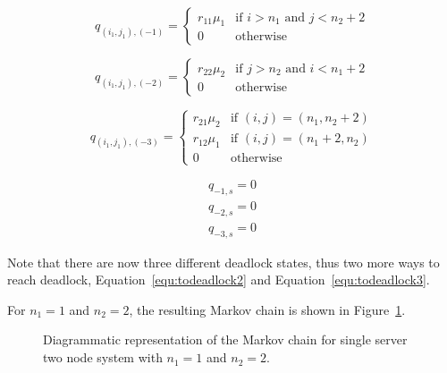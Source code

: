 \documentclass{article}
\numberwithin{equation}{section}
\begin{document}
\begin{equation}\label{equ:todeadlock2}
  q_{(i_1, j_1), (-1)} = \left\{
  \begin{array}{rr}
    r_{11}\mu_1 & \text{if } i > n_1 \text{ and } j < n_2 + 2 \\
    0 & \text{otherwise}
  \end{array}
  \right.
\end{equation}

\begin{equation}\label{equ:todeadlock3}
  q_{(i_1, j_1), (-2)} = \left\{
  \begin{array}{rr}
    r_{22}\mu_2 & \text{if } j > n_2 \text{ and } i < n_1 + 2 \\
    0 & \text{otherwise}
  \end{array}
  \right.
\end{equation}

\begin{equation}\label{eqn:2nssfB}
  q_{(i_1, j_1), (-3)} = \left\{
  \begin{array}{rr}
    r_{21}\mu_2 & \text{if } (i, j) = (n_1, n_2 + 2) \\
    r_{12}\mu_1 & \text{if } (i, j) = (n_1 + 2, n_2) \\
    0 & \text{otherwise}
  \end{array}
  \right.
\end{equation}

\begin{align}
  q_{-1, s} = 0 \\
  q_{-2, s} = 0 \\
  q_{-3, s} = 0
\end{align}

Note that there are now three different deadlock states, thus two more ways to
reach deadlock, Equation~\ref{equ:todeadlock2} and Equation~\ref{equ:todeadlock3}.

For $n_1 = 1$ and $n_2 = 2$, the resulting Markov chain is shown in
Figure~\ref{fig:2nodeMCfeedback}.

\begin{figure}[!htbp]
    \begin{center}
    
    \end{center}
    \caption{Diagrammatic representation of the Markov chain for single server
    two node system with $n_1=1$ and $n_2=2$.}
    \label{fig:2nodeMCfeedback}
\end{figure}
\end{document}
